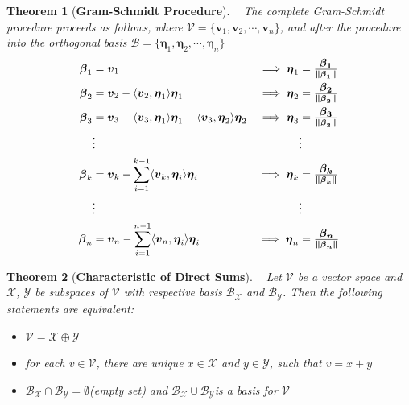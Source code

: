 \documentclass[10.5pt]{article}
\newtheorem{theo}{Theorem}
\begin{document}
\begin{theo}[\textbf{Gram-Schmidt Procedure}]
~ The complete Gram-Schmidt procedure proceeds as follows, where $\mathcal{V}=\{\boldsymbol {v}_{1},\boldsymbol {v}_{2},\cdots ,\boldsymbol {v}_{n}\}$, and after the procedure into the orthogonal basis $\mathcal{B}=\{\boldsymbol {\eta }_{1},\boldsymbol {\eta }_{2},\cdots ,\boldsymbol {\eta }_{n}\}$\\
\begin{align*}
\displaystyle {\boldsymbol {\beta }}_{1}&={\boldsymbol {v}}_{1} &\implies \displaystyle {\boldsymbol {\eta }}_{1}&=\boldsymbol {\beta _{1} \over \|{\boldsymbol {\beta }}_{1}\|} \\
\displaystyle {\boldsymbol {\beta }}_{2}&={\boldsymbol {v}}_{2}-\langle {\boldsymbol {v}}_{2},{\boldsymbol {\eta }}_{1}\rangle {\boldsymbol {\eta }}_{1} &\implies \displaystyle {\boldsymbol {\eta }}_{2}&=\boldsymbol {\beta _{2} \over \|{\boldsymbol {\beta }}_{2}\|}\\
\displaystyle {\boldsymbol {\beta }}_{3}&={\boldsymbol {v}}_{3}-\langle {\boldsymbol {v}}_{3},{\boldsymbol {\eta }}_{1}\rangle {\boldsymbol {\eta }}_{1}-\langle {\boldsymbol {v}}_{3},{\boldsymbol {\eta }}_{2}\rangle {\boldsymbol {\eta }}_{2} &\implies \displaystyle {\boldsymbol {\eta }}_{3}&=\boldsymbol {\beta _{3} \over \|{\boldsymbol {\beta }}_{3}\|}\\
&\vdots & ~ &\vdots \\
\displaystyle {\boldsymbol {\beta }}_{k}&={\boldsymbol {v}}_{k}-\sum _{i=1}^{k-1}\langle {\boldsymbol {v}}_{k},{\boldsymbol {\eta }}_{i}\rangle {\boldsymbol {\eta }}_{i} &\implies \displaystyle {\boldsymbol {\eta }}_{k}&=\boldsymbol {\beta _{k} \over \|{\boldsymbol {\beta }}_{k}\|}\\
&\vdots & ~ &\vdots \\
\displaystyle {\boldsymbol {\beta }}_{n}&={\boldsymbol {v}}_{n}-\sum _{i=1}^{n-1}\langle {\boldsymbol {v}}_{n},{\boldsymbol {\eta }}_{i}\rangle {\boldsymbol {\eta }}_{i} &\implies \displaystyle {\boldsymbol {\eta }}_{n}&=\boldsymbol {\beta _{n} \over \|{\boldsymbol {\beta }}_{n}\|}\\
\end{align*}
\end{theo}
\begin{theo}[\textbf{Characteristic of Direct Sums}]
~ Let $\mathcal{V}$ be a vector space and $\mathcal{X}$, $\mathcal{Y}$ be subspaces of $\mathcal{V}$ with respective basis $\mathcal{B}_{\mathcal{X}}$ and $\mathcal{B}_{\mathcal{Y}}$. Then the following statements are equivalent:
\begin{itemize}
\item $\mathcal{V}=\mathcal{X}\oplus \mathcal{Y}$
\item \textit{for each $v\in \mathcal{V}$, there are unique $x\in \mathcal{X}$ and $y\in \mathcal{Y}$, such that $v=x+y$}
\item \textit{$\mathcal{B}_{\mathcal{X}}\cap \mathcal{B}_{\mathcal{Y}}=\emptyset$(empty set) and $\mathcal{B}_{\mathcal{X}}\cup \mathcal{B}_{\mathcal{Y}}$is a basis for $\mathcal{V}$}
\end{itemize}
\end{theo}
\end{document}
